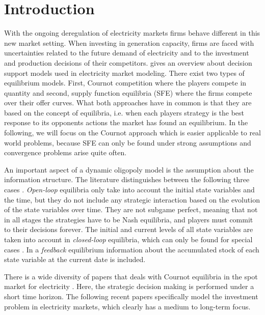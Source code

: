 \section{Introduction}

With the ongoing deregulation of electricity markets firms behave different in this new market setting. When investing in generation capacity, firms are faced with uncertainties related to the future demand of electricity and to the investment and production decisions of their competitors. \cite{Ventosa2005} gives an overview about decision support models used in electricity market modeling. There exist two types of equilibrium models. First, Cournot competition where the players compete in quantity and second, supply function equilibria (SFE) where the firms compete over their offer curves. What both approaches have in common is that they are based on the concept of \cite{Nash1951} equilibria, i.e. when each players strategy is the best response to its opponents actions the market has found an equilibrium. In the following, we will focus on the Cournot approach which is easier applicable to real world problems, because SFE can only be found under strong assumptions and convergence problems arise quite often.

An important aspect of a dynamic oligopoly model is the assumption about the information structure. The literature distinguishes between the following three cases \citep[see, e.g.,][]{Cellini2004}. \emph{Open-loop} equilibria only take into account the initial state variables and the time, but they do not include any strategic interaction based on the evolution of the state variables over time. They are not subgame perfect, meaning that not in all stages the strategies have to be Nash equilibria, and players must commit to their decisions forever. The initial and current levels of all state variables are taken into account in \emph{closed-loop} equilibria, which can only be found for special cases \citep[see][]{Murphy2005}. In a \emph{feedback} equilibrium information about the accumulated stock of each state variable at the current date is included.

There is a wide diversity of papers that deals with Cournot equilibria in the spot market for electricity \citep[see, e.g.][]{Borenstein1999, Otero-Novas2000}. Here, the strategic decision making is performed under a short time horizon. The following recent papers specifically model the investment problem in electricity markets, which clearly has a medium to long-term focus.

